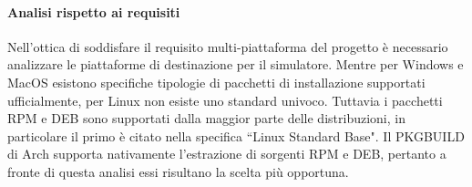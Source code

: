 \paragraph{Analisi rispetto ai requisiti}
Nell'ottica di soddisfare il requisito multi-piattaforma del progetto è necessario analizzare le piattaforme di destinazione per il simulatore. Mentre per Windows e MacOS esistono specifiche tipologie di pacchetti di installazione supportati ufficialmente, per Linux non esiste uno standard univoco. Tuttavia  i pacchetti RPM e DEB sono supportati dalla maggior parte delle distribuzioni, in particolare il primo è citato nella specifica ``Linux Standard Base". Il PKGBUILD di Arch supporta nativamente l'estrazione di sorgenti RPM e DEB, pertanto a fronte di questa analisi essi risultano la scelta più opportuna.

